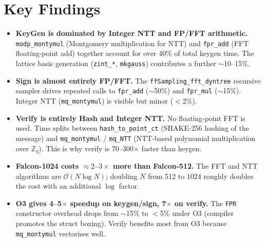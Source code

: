 \documentclass[11pt,a4paper]{article}
\begin{document}
\section{Key Findings}

\begin{itemize}

  \item \textbf{KeyGen is dominated by Integer NTT and FP/FFT arithmetic.}
        \texttt{modp\_montymul} (Montgomery multiplication for NTT)
        and \texttt{fpr\_add} (FFT floating-point add) together
        account for over 40\% of total keygen time.
        The lattice basis generation (\texttt{zint\_*}, \texttt{mkgauss})
        contributes a further $\sim$10--15\%.

  \item \textbf{Sign is almost entirely FP/FFT.}
        The \texttt{ffSampling\_fft\_dyntree} recursive sampler
        drives repeated calls to \texttt{fpr\_add} ($\sim$50\%)
        and \texttt{fpr\_mul} ($\sim$15\%).
        Integer NTT (\texttt{mq\_montymul}) is visible but minor ($<$2\%).

  \item \textbf{Verify is entirely Hash and Integer NTT.}
        No floating-point FFT is used. Time splits between
        \texttt{hash\_to\_point\_ct} (SHAKE-256 hashing of the message)
        and \texttt{mq\_montymul} / \texttt{mq\_NTT}
        (NTT-based polynomial multiplication over $\mathbb{Z}_q$).
        This is why verify is 70--300$\times$ faster than keygen.

  \item \textbf{Falcon-1024 costs $\approx 2$--$3\times$ more than Falcon-512.}
        The FFT and NTT algorithms are $\mathcal{O}(N \log N)$;
        doubling $N$ from 512 to 1024 roughly doubles the cost
        with an additional $\log$ factor.

  \item \textbf{O3 gives 4--5$\times$ speedup on keygen/sign,
        7$\times$ on verify.}
        The \texttt{FPR} constructor overhead drops from $\sim$15\%
        to $<$5\% under O3 (compiler promotes the struct boxing).
        Verify benefits most from O3 because \texttt{mq\_montymul}
        vectorises well.

\end{itemize}
\end{document}
